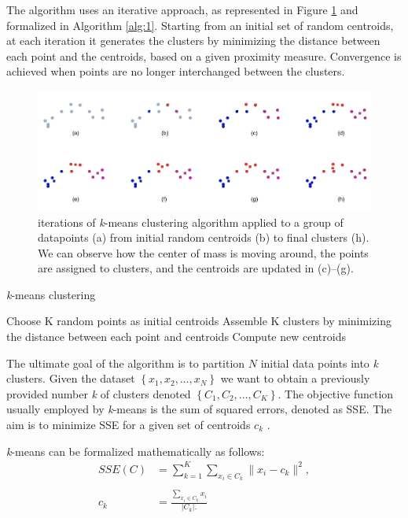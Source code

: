 \documentclass{usiinftr}
\begin{document}
The algorithm uses an iterative approach, as represented in Figure \ref{fig:1} and formalized in Algorithm \ref{alg:1}. Starting from an initial set of random centroids, at each iteration it generates the clusters by minimizing the distance between each point and the centroids, based on a given proximity measure. Convergence is achieved when points are no longer interchanged between the clusters.
\begin{figure}[h]
	\centering
	\includegraphics[scale=0.2]{./img/Kmeans_final}
	\caption{iterations of \textit{k}-means clustering algorithm applied to a group of datapoints (a) from initial random centroids (b) to final clusters (h). We can observe how the center of mass is moving around, the points are assigned to clusters, and the centroids are updated in (c)--(g).}
	\label{fig:1}
\end{figure}
\begin{algorithm}
	\caption{\textit{k}-means clustering}\label{kmeans}
	\label{alg:1}
	\begin{algorithmic}[1]
		\State Choose K random points as initial centroids 
		\State Assemble K clusters by minimizing the distance between each point and centroids
		\State Compute new centroids
		\EndWhile
		\EndProcedure
	\end{algorithmic}
\end{algorithm}

The ultimate goal of the algorithm is to partition $N$ initial data points into \textit{k} clusters. Given the dataset $\left\lbrace x_1, x_2, \dots, x_N \right\rbrace$ we want to obtain a previously provided number \textit{k} of clusters denoted $\left\lbrace C_1, C_2, \dots, C_K \right\rbrace $. The objective function usually employed by \textit{k}-means is the sum of squared errors, denoted as SSE. The aim is to minimize SSE for a given set of centroids $c_k$ \cite{11}.

\textit{k}-means can be  formalized mathematically as follows: 
\begin{equation*}
\begin{split}
SSE(C) &= \sum_{k=1}^{K} \sum_{x_i \in C_k} \| x_i - c_k\|^2, \\ \\
c_k &= \frac{\sum\limits_{x_i \in C_k} x_i}{|C_k|.}
\end{split}
\end{equation*}
\end{document}
